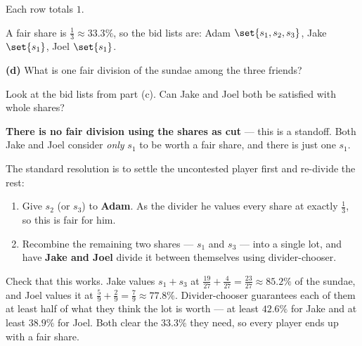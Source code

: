 \documentclass[12pt]{ximera}
\begin{document}
\begin{problem}
\begin{prompt}
\begin{feedback}
Each row totals $1$. \checkmark

A fair share is $\frac13 \approx 33.3\%$, so the bid lists are: Adam $\set{s_1,s_2,s_3}$,
Jake $\set{s_1}$, Joel $\set{s_1}$.
\end{feedback}
\end{prompt}

\begin{prompt}
\textbf{(d)} What is one fair division of the sundae among the three friends?

\begin{freeResponse}
\end{freeResponse}

\begin{hint}
Look at the bid lists from part (c). Can Jake and Joel both be satisfied with whole
shares?
\end{hint}

\begin{feedback}
\textbf{There is no fair division using the shares as cut} --- this is a standoff. Both
Jake and Joel consider \emph{only} $s_1$ to be worth a fair share, and there is just one
$s_1$.

The standard resolution is to settle the uncontested player first and re-divide the
rest:
\begin{enumerate}
\item Give $s_2$ (or $s_3$) to \textbf{Adam}. As the divider he values every share at
      exactly $\frac13$, so this is fair for him.
\item Recombine the remaining two shares --- $s_1$ and $s_3$ --- into a single lot, and
      have \textbf{Jake and Joel} divide it between themselves using divider-chooser.
\end{enumerate}

Check that this works. Jake values $s_1 + s_3$ at
$\frac{19}{27}+\frac{4}{27} = \frac{23}{27} \approx 85.2\%$ of the sundae, and Joel
values it at $\frac59 + \frac29 = \frac79 \approx 77.8\%$. Divider-chooser guarantees
each of them at least half of what they think the lot is worth --- at least $42.6\%$ for
Jake and at least $38.9\%$ for Joel. Both clear the $33.3\%$ they need, so every player
ends up with a fair share.
\end{feedback}
\end{prompt}
\end{problem}
\end{document}
